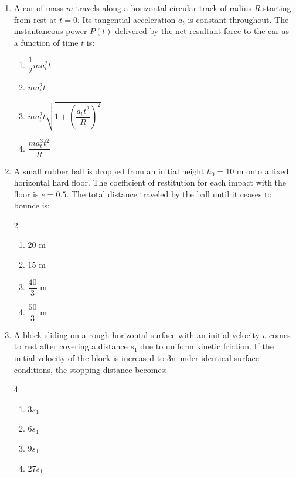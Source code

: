 \documentclass[11pt,a4paper]{article}
\begin{document}
\begin{enumerate}[label=\textbf{\arabic*.},leftmargin=18pt,itemsep=12pt]
  \item A car of mass $m$ travels along a horizontal circular track of radius $R$ starting from rest at $t = 0$. Its tangential acceleration $a_t$ is constant throughout. The instantaneous power $P(t)$ delivered by the net resultant force to the car as a function of time $t$ is:
  \begin{enumerate}[label=(\Alph*)]
    \item $\dfrac{1}{2} m a_t^2 t$
    \item $m a_t^2 t$
    \item $m a_t^2 t \sqrt{1 + \left(\dfrac{a_t t^2}{R}\right)^2}$
    \item $\dfrac{m a_t^3 t^2}{R}$
  \end{enumerate}

  \item A small rubber ball is dropped from an initial height $h_0 = 10\text{ m}$ onto a fixed horizontal hard floor. The coefficient of restitution for each impact with the floor is $e = 0.5$. The total distance traveled by the ball until it ceases to bounce is:
  \begin{multicols}{2}
    \begin{enumerate}[label=(\Alph*)]
      \item $20\text{ m}$
      \item $15\text{ m}$
      \item $\dfrac{40}{3}\text{ m}$
      \item $\dfrac{50}{3}\text{ m}$
    \end{enumerate}
  \end{multicols}

  \item A block sliding on a rough horizontal surface with an initial velocity $v$ comes to rest after covering a distance $s_1$ due to uniform kinetic friction. If the initial velocity of the block is increased to $3v$ under identical surface conditions, the stopping distance becomes:
  \begin{multicols}{4}
    \begin{enumerate}[label=(\Alph*)]
      \item $3 s_1$
      \item $6 s_1$
      \item $9 s_1$
      \item $27 s_1$
    \end{enumerate}
  \end{multicols}


\end{enumerate}
\end{document}
